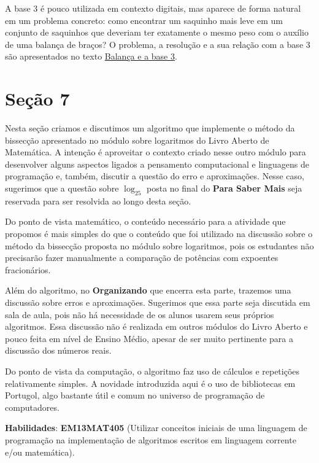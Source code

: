 A base 3 é pouco utilizada em contexto digitais, mas aparece de forma natural em um problema concreto: como encontrar um saquinho mais leve em um conjunto de saquinhos que deveriam ter exatamente o mesmo peso com o auxílio de uma balança de braços? O problema, a resolução e a sua relação com a base 3 são apresentados no texto \href{http://rpm.org.br/cdrpm/79/4.html}{Balança e a base 3}.

\section{Seção 7}

\label{comp-exp7}
\def\currentcolor{session1}
\begin{texto}
{
Nesta seção criamos e discutimos um algoritmo que implemente o método da bissecção apresentado no módulo sobre logaritmos do Livro Aberto de Matemática. A intenção é aproveitar o contexto criado nesse outro módulo para desenvolver alguns aspectos ligados a pensamento computacional e linguagens de programação e, também, discutir a questão do erro e aproximações. Nesse caso, sugerimos que a questão sobre $\log_25$ posta no final do \textbf{Para Saber Mais} seja reservada para ser resolvida ao longo desta seção.

Do ponto de vista matemático, o conteúdo necessário para a atividade que propomos é mais simples do que o conteúdo que foi utilizado na discussão sobre o método da bissecção proposta no módulo sobre logaritmos, pois os estudantes não precisarão fazer manualmente a comparação de potências com expoentes fracionários.

Além do algoritmo, no \textbf{Organizando} que encerra esta parte, trazemos uma discussão sobre erros e aproximações. Sugerimos que essa parte seja discutida em sala de aula, pois não há necessidade de os alunos usarem seus próprios algoritmos. Essa discussão não é realizada em outros módulos do Livro Aberto e pouco feita em nível de Ensino Médio, apesar de ser muito pertinente para a discussão dos números reais.

Do ponto de vista da computação, o algoritmo faz uso de cálculos e repetições relativamente simples. A novidade introduzida aqui é o uso de bibliotecas em Portugol, algo bastante útil e comum no universo de programação de computadores.

\textbf{Habilidades}: \textbf{EM13MAT405} (Utilizar conceitos iniciais de uma linguagem de programação na implementação de algoritmos escritos em linguagem corrente e/ou matemática).
}
\end{texto}
